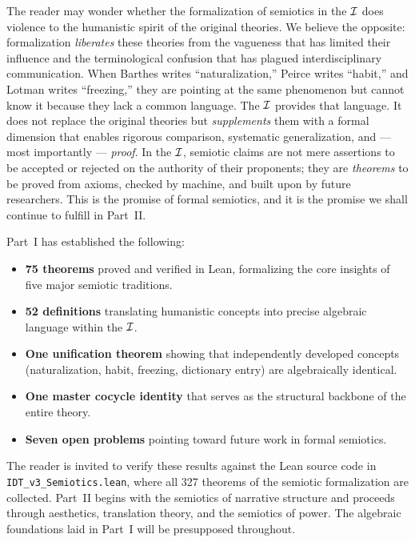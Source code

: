 \begin{remark}
The reader may wonder whether the formalization of semiotics in the
$\mathcal{I}$ does violence to the humanistic spirit of the original theories.
We believe the opposite: formalization \emph{liberates} these theories
from the vagueness that has limited their influence and the
terminological confusion that has plagued interdisciplinary
communication. When Barthes writes ``naturalization,'' Peirce writes
``habit,'' and Lotman writes ``freezing,'' they are pointing at the
same phenomenon but cannot know it because they lack a common
language. The $\mathcal{I}$ provides that language. It does not replace the
original theories but \emph{supplements} them with a formal dimension
that enables rigorous comparison, systematic generalization, and ---
most importantly --- \emph{proof}. In the $\mathcal{I}$, semiotic claims are
not mere assertions to be accepted or rejected on the authority of
their proponents; they are \emph{theorems} to be proved from axioms,
checked by machine, and built upon by future researchers. This is the
promise of formal semiotics, and it is the promise we shall continue
to fulfill in Part~II.
\end{remark}

\begin{remark}
Part~I has established the following:
\begin{itemize}
\item \textbf{75 theorems} proved and verified in Lean, formalizing
the core insights of five major semiotic traditions.
\item \textbf{52 definitions} translating humanistic concepts into
precise algebraic language within the $\mathcal{I}$.
\item \textbf{One unification theorem} showing that independently
developed concepts (naturalization, habit, freezing, dictionary
entry) are algebraically identical.
\item \textbf{One master cocycle identity} that serves as the
structural backbone of the entire theory.
\item \textbf{Seven open problems} pointing toward future work in
formal semiotics.
\end{itemize}
The reader is invited to verify these results against the Lean source
code in \texttt{IDT\_v3\_Semiotics.lean}, where all 327 theorems of the
semiotic formalization are collected. Part~II begins with the
semiotics of narrative structure and proceeds through aesthetics,
translation theory, and the semiotics of power. The algebraic
foundations laid in Part~I will be presupposed throughout.
\end{remark}

